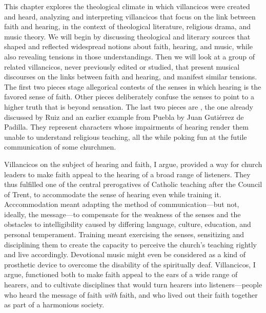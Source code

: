 This chapter explores the theological climate in which villancicos were created
and heard, analyzing and interpreting villancicos that focus on the link between
faith and hearing, in the context of theological literature, religious drama,
and music theory.
We will begin by discussing theological and literary sources that shaped and
reflected widespread notions about faith, hearing, and music, while also
revealing tensions in those understandings.
Then we will look at a group of related villancicos, never previously edited or
studied, that present musical discourses on the links between faith and hearing,
and manifest similar tensions.
The first two pieces stage allegorical contests of the senses in which hearing
is the favored sense of faith.
Other pieces deliberately confuse the senses to point to a higher truth that is
beyond sensation.
The last two pieces are , the one already
discussed by Ruiz and an earlier example from Puebla by Juan Gutiérrez de
Padilla.
They represent characters whose impairments of hearing render them unable to
understand religious teaching, all the while poking fun at the futile
communication of some churchmen.

Villancicos on the subject of hearing and faith, I argue, provided a way for
church leaders to make faith appeal to the hearing of a broad range of
listeners.
They thus fulfilled one of the central prerogatives of Catholic teaching after
the Council of Trent, to accommodate the sense of hearing even while training
it.
Acccommodation meant adapting the method of communication---but not, ideally,
the message---to compensate for the weakness of the senses and the obstacles to
intelligibility caused by differing language, culture, education, and personal
temperament. 
Training meant exercising the senses, sensitizing and disciplining them to
create the capacity to perceive the church's teaching rightly and live
accordingly.
Devotional music might even be considered as a kind of prosthetic device to
overcome the disability of the spiritually deaf.
Villancicos, I argue, functioned both to make faith appeal to the
ears of a wide range of hearers, and to cultivate disciplines that would turn
hearers into listeners---people who heard the message of faith \emph{with}
faith, and who lived out their faith together as part of a harmonious society.

